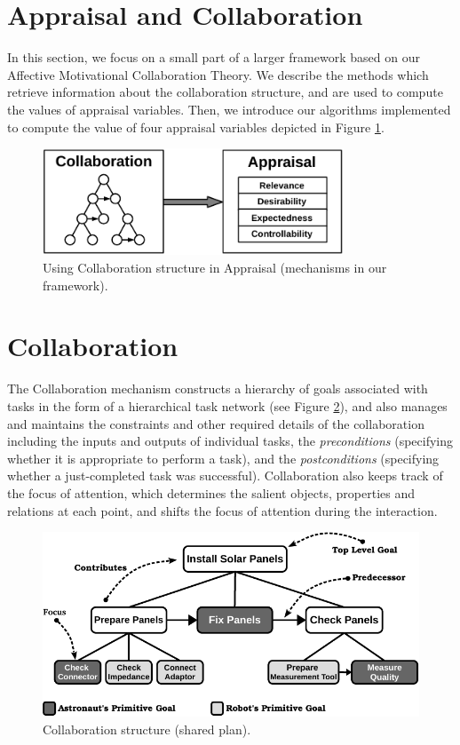 \documentclass[12pt]{report}
\begin{document}
\section{Appraisal and Collaboration}
In this section, we focus on a small part of a larger framework based on our
Affective Motivational Collaboration Theory. We describe the methods which
retrieve information about the collaboration structure, and are used to compute
the values of appraisal variables. Then, we introduce our algorithms implemented
to compute the value of four appraisal variables depicted in Figure
\ref{fig:appraisal-collaboration}.

\begin{figure}[tbh]
  \centering
  \includegraphics[width=0.8\textwidth]{figure/appraisal-collaboration-croped.pdf}
  \caption{{\fontsize{9}{9}\selectfont Using Collaboration structure in
  Appraisal (mechanisms in our framework).}}
  \label{fig:appraisal-collaboration}
\end{figure}

\section{Collaboration}
The Collaboration mechanism constructs a hierarchy of goals associated with
tasks in the form of a hierarchical task network (see Figure \ref{fig:cs}), and
also manages and maintains the constraints and other required details of the
collaboration including the inputs and outputs of individual tasks, the
\textit{preconditions} (specifying whether it is appropriate to perform a task),
and the \textit{postconditions} (specifying whether a just-completed task was
successful). Collaboration also keeps track of the focus of attention, which
determines the salient objects, properties and relations at each point, and
shifts the focus of attention during the interaction.

\begin{figure}[tbh]
  \centering
  \includegraphics[width=1\textwidth]{figure/collaborationStructure-small-croped.pdf}
  \caption{{\fontsize{9}{9}\selectfont Collaboration structure (shared plan).}}
  \label{fig:cs}
\end{figure}
\end{document}
